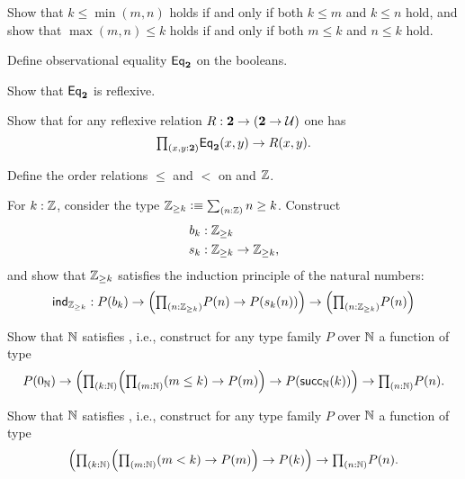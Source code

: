 \begin{exercises}
\begin{subexenum}
  \item Show that $k\leq \min(m,n)$ holds if and only if both $k\leq m$ and $k\leq n$ hold, and show that $\max(m,n)\leq k$ holds if and only if both $m\leq k$ and $n\leq k$ hold.
  \end{subexenum}
\item \label{ex:obs_bool}
  \begin{subexenum}
  \item Define observational equality $\mathsf{Eq}_\mathbf{2}$ on the booleans.
  \item Show that $\mathsf{Eq}_\mathbf{2}$ is reflexive.
  \item Show that for any reflexive relation $R:\mathbf{2}\to(\mathbf{2}\to \mathcal{U})$ one has
    \begin{equation*}
      \prd{x,y:\bool} \mathsf{Eq}_\bool(x,y)\to R(x,y).
    \end{equation*}
  \end{subexenum}
\item \label{ex:int_order}
  \begin{subexenum}
  \item Define the order relations $\leq$ and $<$ on and $\mathbb{Z}$.
  \item For $k:\mathbb{Z}$, consider the type $\Z_{\geq k}\defeq \sm{n:\Z}n\geq k$. Construct
    \begin{align*}
      b_k & : \mathbb{Z}_{\geq k} \\
      s_k & : \mathbb{Z}_{\geq k}\to\mathbb{Z}_{\geq k},
    \end{align*}
    and show that $\mathbb{Z}_{\geq k}$ satisfies the induction principle of the natural numbers:
    \begin{equation*}
      \ind{\Z_{\geq k}} : P(b_k)\to \Big(\prd{n:\Z_{\geq k}} P(n)\to P(s_k(n))\Big)\to \Big(\prd{n:\Z_{\geq k}} P(n)\Big)
    \end{equation*}
  \end{subexenum}
\item
  \begin{subexenum}
  \item Show that $\mathbb{N}$ satisfies , i.e., construct for any type family $P$ over $\mathbb{N}$ a function of type
    \begin{equation*}
      P(\zeroN) \to \Big(\prd{k:\N}\Big(\prd{m:\N} (m\leq k) \to P(m)\Big)\to P(\succN(k))\Big) \to \prd{n:\N}P(n).
    \end{equation*}
  \item Show that $\mathbb{N}$ satisfies , i.e., construct for any type family $P$ over $\mathbb{N}$ a function of type
    \begin{equation*}
      \Big(\prd{k:\N} \Big(\prd{m:\N} (m< k) \to P(m)\Big)\to P(k)\Big) \to \prd{n:\N}P(n).
    \end{equation*}
  \end{subexenum}
\end{exercises}
